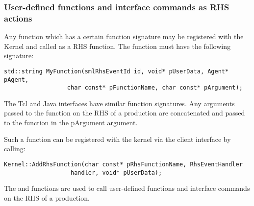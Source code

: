\subsubsection{User-defined functions and interface commands as RHS actions}

Any function which has a certain function signature may be registered with the
Kernel and called as a RHS function.  The function must have the following signature:

\begin{verbatim}
std::string MyFunction(smlRhsEventId id, void* pUserData, Agent* pAgent,
                  char const* pFunctionName, char const* pArgument);
\end{verbatim}

The Tcl and Java interfaces have similar function signatures. Any arguments passed
to the function on the RHS of a production are concatenated and passed to the function
in the pArgument argument.

Such a function can be registered with the kernel via the client interface by calling:

\begin{verbatim}
Kernel::AddRhsFunction(char const* pRhsFunctionName, RhsEventHandler 
                   handler, void* pUserData);
\end{verbatim}

The  and  functions are used to call user-defined functions and interface
commands on the RHS of a production.


